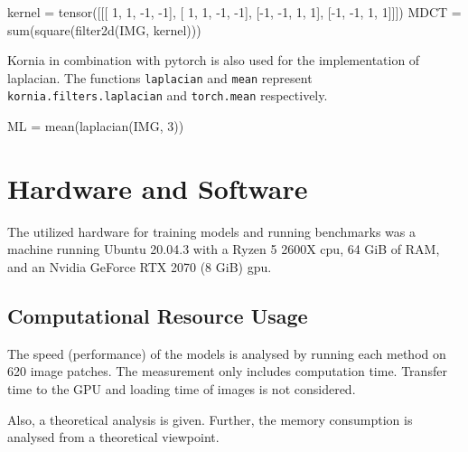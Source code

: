 \begin{python}
kernel = tensor([[[ 1,  1, -1, -1],
                  [ 1,  1, -1, -1],
                  [-1, -1,  1,  1],
                  [-1, -1,  1,  1]]])
MDCT = sum(square(filter2d(IMG, kernel)))
\end{python}

Kornia in combination with pytorch is also used for the implementation of \ac{laplacian}. The functions \texttt{laplacian} and \texttt{mean} represent \texttt{kornia.filters.laplacian} and \texttt{torch.mean} respectively.

\begin{python}
ML = mean(laplacian(IMG, 3))
\end{python}

\section{Hardware and Software}
\label{sec:Methods:Hardware}

The utilized hardware for training models and running benchmarks was a machine running Ubuntu 20.04.3 with a Ryzen 5 2600X \ac{cpu}, 64 GiB of RAM, and an Nvidia GeForce RTX 2070 (8 GiB) \ac{gpu}.


\subsection{Computational Resource Usage}
\label{sec:Methods:Evaluation:Computation}

The speed (performance) of the models is analysed by running each method on 620 image patches. The measurement only includes computation time. Transfer time to the GPU and loading time of images is not considered.

Also, a theoretical analysis is given. Further, the memory consumption is analysed from a theoretical viewpoint. 

